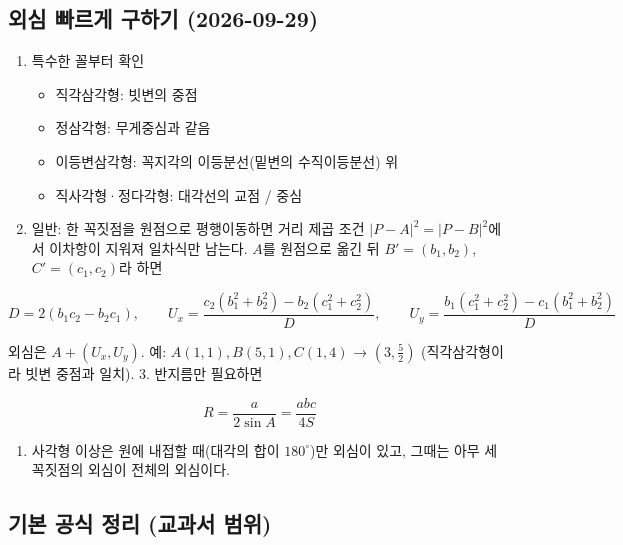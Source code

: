 \subsection{외심 빠르게 구하기 (2026-09-29)}

\begin{enumerate}
\def\labelenumi{\arabic{enumi}.}
\tightlist
\item
  특수한 꼴부터 확인

  \begin{itemize}
  \tightlist
  \item
    직각삼각형: 빗변의 중점
  \item
    정삼각형: 무게중심과 같음
  \item
    이등변삼각형: 꼭지각의 이등분선(밑변의 수직이등분선) 위
  \item
    직사각형·정다각형: 대각선의 교점 / 중심
  \end{itemize}
\item
  일반: 한 꼭짓점을 원점으로 평행이동하면 거리 제곱 조건
  \(|P-A|^2=|P-B|^2\)에서 이차항이 지워져 일차식만 남는다. \(A\)를
  원점으로 옮긴 뒤 \(B'=(b_1,b_2)\), \(C'=(c_1,c_2)\)라 하면
\end{enumerate}

\[
D=2(b_1c_2-b_2c_1),\qquad U_x=\frac{c_2(b_1^2+b_2^2)-b_2(c_1^2+c_2^2)}{D},\qquad U_y=\frac{b_1(c_1^2+c_2^2)-c_1(b_1^2+b_2^2)}{D}
\]

외심은 \(A+(U_x,U_y)\). 예: \(A(1,1),B(5,1),C(1,4)\) → \((3,\tfrac52)\)
(직각삼각형이라 빗변 중점과 일치). 3. 반지름만 필요하면

\[
R=\frac{a}{2\sin A}=\frac{abc}{4S}
\]

\begin{enumerate}
\def\labelenumi{\arabic{enumi}.}
\setcounter{enumi}{3}
\tightlist
\item
  사각형 이상은 원에 내접할 때(대각의 합이 \(180^\circ\))만 외심이 있고,
  그때는 아무 세 꼭짓점의 외심이 전체의 외심이다.
\end{enumerate}

\subsection{기본 공식 정리 (교과서 범위)}

